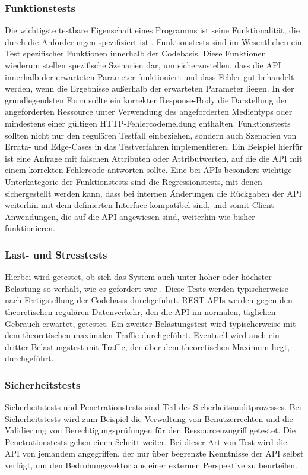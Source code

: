 \subsubsection{Funktionstests}
Die wichtigste testbare Eigenschaft eines Programms ist seine Funktionalität, die durch die Anforderungen spezifiziert ist \parencite[457]{ludewig2007software}. Funktionstests sind im Wesentlichen ein Test spezifischer Funktionen innerhalb der Codebasis. Diese Funktionen wiederum stellen spezifische Szenarien dar, um sicherzustellen, dass die API innerhalb der erwarteten Parameter funktioniert und dass Fehler gut behandelt werden, wenn die Ergebnisse außerhalb der erwarteten Parameter liegen. In der grundlegendsten Form sollte ein korrekter Response-Body die Darstellung der angeforderten Ressource unter Verwendung des angeforderten Medientyps oder mindestens einer gültigen HTTP-Fehlercodemeldung enthalten. Funktionstests sollten nicht nur den regulären Testfall einbeziehen, sondern auch Szenarien von Errata- und Edge-Cases in das Testverfahren implementieren. Ein Beispiel hierfür ist eine Anfrage mit falschen Attributen oder Attributwerten, auf die die API mit einem korrekten Fehlercode antworten sollte. Eine bei APIs besonders wichtige Unterkategorie der Funktionstests sind die Regressionstests, mit denen sichergestellt werden kann, dass bei internen Änderungen die Rückgaben der API weiterhin mit dem definierten Interface kompatibel sind, und somit Client-Anwendungen, die auf die API angewiesen sind, weiterhin wie bisher funktionieren.

\subsubsection{Last- und Stresstests}
Hierbei wird getestet, ob sich das System auch unter hoher oder höchster Belastung so verhält, wie es gefordert war \parencite[458]{ludewig2007software}. Diese Tests werden typischerweise nach Fertigstellung der Codebasis durchgeführt. REST APIs werden gegen den theoretischen regulären Datenverkehr, den die API im normalen, täglichen Gebrauch erwartet, getestet. Ein zweiter Belastungstest wird typischerweise mit dem theoretischen maximalen Traffic durchgeführt. Eventuell wird auch ein dritter Belastungstest mit Traffic, der über dem theoretischen Maximum liegt, durchgeführt.

\subsubsection{Sicherheitstests}
Sicherheitstests und Penetrationstests sind Teil des Sicherheitsauditprozesses. Bei Sicherheitstests wird zum Beispiel die Verwaltung von Benutzerrechten und die Validierung von Berechtigungsprüfungen für den Ressourcenzugriff getestet. Die Penetrationstests gehen einen Schritt weiter. Bei dieser Art von Test wird die API von jemandem angegriffen, der nur über begrenzte Kenntnisse der API selbst verfügt, um den Bedrohungsvektor aus einer externen Perspektive zu beurteilen.

